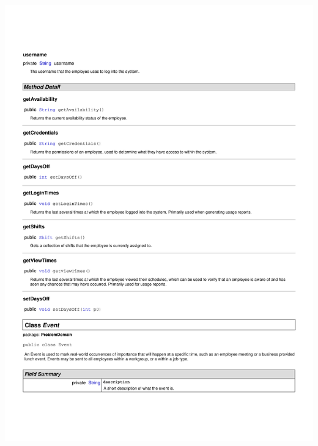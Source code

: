 \documentclass[letterpaper,12pt]{report}
\begin{document}
\includegraphics[scale=0.9,trim=20mm 30mm 25mm 25mm]{externals/ProblemDomainDataDictionary3.pdf}
\newpage
\end{document}
